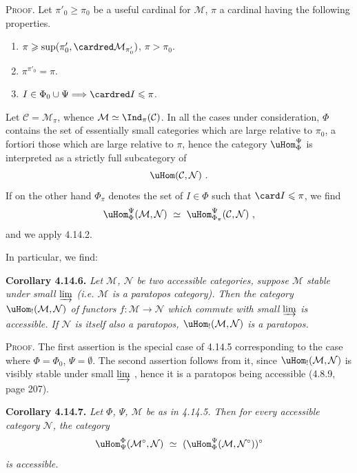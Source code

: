 
\noindent\textsc{Proof}. Let $\pi'_0\geqslant\pi_0$ be a useful cardinal for $\mathcal{M}$, $\pi$ a cardinal having the following properties.
\begin{enumerate}[leftmargin=2.5em]
\item[a)] $\pi\geqslant\sup(\pi'_0,\cardred\mathcal{M}_{\pi'_0})$, $\pi>\pi_0$.
\item[b)] $\pi^{\pi'_0}=\pi$.
\item[c)] $I\in\Phi_0\cup\Psi\Longrightarrow\cardred I\leqslant\pi$.
\end{enumerate}
\noindent Let $\mathcal{C}=\mathcal{M}_\pi$, whence $\mathcal{M}\simeq\Ind_\pi(\mathcal{C})$. In all the cases under consideration, $\Phi$ contains the set of essentially small categories which are large relative to $\pi_0$, a fortiori those which are large relative to $\pi$, hence the category $\uHom^{\Psi}_{\Phi}$ is interpreted as a strictly full subcategory of
\[
\uHom(\mathcal{C},\mathcal{N})\ .
\]
If on the other hand $\Phi_\pi$ denotes the set of $I\in\Phi$ such that $\card I\leqslant\pi$, we find
\[
\uHom^{\Psi}_{\Phi}(\mathcal{M},\mathcal{N})\ \simeq\ \uHom^{\Psi}_{\Phi_\pi}(\mathcal{C},\mathcal{N})\ ,
\]
and we apply 4.14.2.


In particular, we find:

\noindent\textbf{Corollary 4.14.6.} {\itshape Let $\mathcal{M}$, $\mathcal{N}$ be two accessible categories, suppose $\mathcal{M}$ stable under small $\varinjlim$ (i.e. $\mathcal{M}$ is a paratopos category). Then the category $\uHom_{!}(\mathcal{M},\mathcal{N})$ of functors $f:\mathcal{M}\longrightarrow\mathcal{N}$ which commute with small $\varinjlim$ is accessible. If $\mathcal{N}$ is itself also a paratopos, $\uHom_{!}(\mathcal{M},\mathcal{N})$ is a paratopos.}

\noindent\textsc{Proof}. The first assertion is the special case of 4.14.5 corresponding to the case where $\Phi=\Phi_0$, $\Psi=\emptyset$. The second assertion follows from it, since $\uHom_{!}(\mathcal{M},\mathcal{N})$ is visibly stable under small $\varinjlim$ , hence it is a paratopos being accessible (4.8.9, page 207).

\noindent\textbf{Corollary 4.14.7.} {\itshape Let $\Phi$, $\Psi$, $\mathcal{M}$ be as in 4.14.5. Then for every accessible category $\mathcal{N}$, the category
\[
\uHom^{\Phi}_{\Psi}(\mathcal{M}^{\circ},\mathcal{N})\ \simeq\ (\uHom^{\Psi}_{\Phi}(\mathcal{M},\mathcal{N}^{\circ}))^{\circ}
\]
is accessible.}

